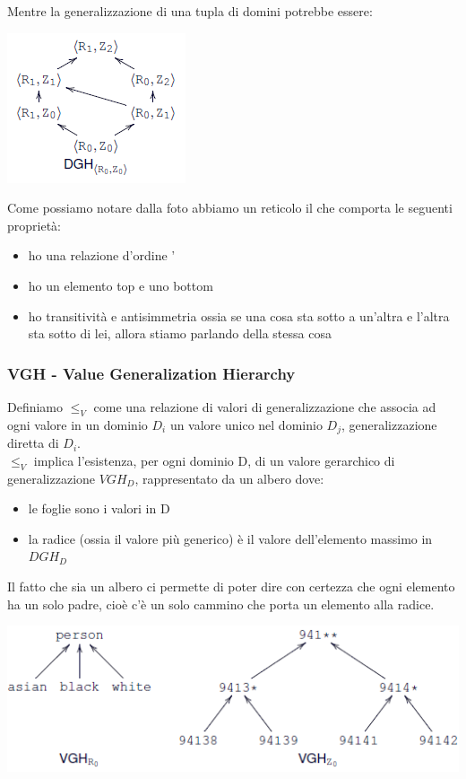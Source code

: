 Mentre la generalizzazione di una tupla di domini potrebbe essere:
\begin{center}
    \includegraphics[scale=0.7]{img/retgen.png}
\end{center}
Come possiamo notare dalla foto abbiamo un reticolo il che comporta le seguenti proprietà:
\begin{itemize}
    \item ho una relazione d'ordine
    '\item ho un elemento top e uno bottom
    \item ho transitività e antisimmetria ossia se una cosa sta sotto a un'altra e l'altra sta sotto di lei, allora stiamo parlando della stessa cosa
\end{itemize}

\subsubsection{VGH - Value Generalization Hierarchy}
Definiamo \(\leq_V\) come una relazione di valori di generalizzazione che associa ad ogni valore in un dominio \(D_i\) un valore unico nel dominio \(D_j\), generalizzazione diretta di \(D_i\).\\
\(\leq_V\) implica l'esistenza, per ogni dominio D, di un valore gerarchico di generalizzazione \(VGH_D\), rappresentato da un albero dove:
\begin{itemize}
    \item le foglie sono i valori in D
    \item la radice (ossia il valore più generico) è il valore dell'elemento massimo in \(DGH_D\)
\end{itemize}
Il fatto che sia un albero ci permette di poter dire con certezza che ogni elemento ha un solo padre, cioè c'è un solo cammino che porta un elemento alla radice.
\begin{center}
    \includegraphics[scale=0.7]{img/vgh.png}
\end{center}
